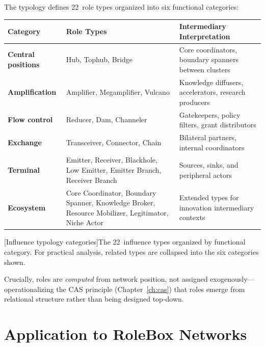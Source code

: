 \documentclass[../main.tex]{subfiles}
\begin{document}
The typology defines 22~role types organized into six functional
categories:

\tableminimal
\begin{center}
\scriptsize
\begin{tabular}{@{}p{2.8cm}p{4.5cm}p{4.5cm}@{}}
\toprule
\textbf{Category} & \textbf{Role Types} & \textbf{Intermediary Interpretation} \\
\midrule
\textbf{Central positions} & Hub, Tophub, Bridge &
  Core coordinators, boundary spanners between clusters \\
\addlinespace
\textbf{Amplification} & Amplifier, Megamplifier, Vulcano &
  Knowledge diffusers, accelerators, research producers \\
\addlinespace
\textbf{Flow control} & Reducer, Dam, Channeler &
  Gatekeepers, policy filters, grant distributors \\
\addlinespace
\textbf{Exchange} & Transceiver, Connector, Chain &
  Bilateral partners, internal coordinators \\
\addlinespace
\textbf{Terminal} & Emitter, Receiver, Blackhole, Low Emitter,
  Emitter Branch, Receiver Branch &
  Sources, sinks, and peripheral actors \\
\addlinespace
\textbf{Ecosystem} & Core Coordinator, Boundary Spanner,
  Knowledge Broker, Resource Mobilizer, Legitimator, Niche Actor &
  Extended types for innovation intermediary contexts \\
\bottomrule
\end{tabular}
[Influence typology categories]{The 22~influence types
organized by functional category. For practical analysis, related types are
collapsed into the six categories shown.}
\end{center}
\normalsize

Crucially, roles are \emph{computed} from network position, not assigned
exogenously---operationalizing the CAS principle (Chapter~\ref{ch:cas}) that
roles emerge from relational structure rather than being designed top-down.


\section*{Application to RoleBox Networks}
\end{document}
